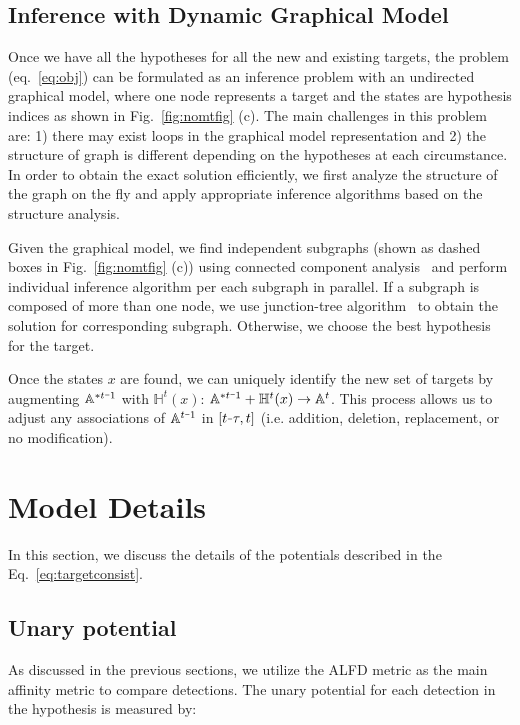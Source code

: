 \documentclass[10pt,twocolumn,letterpaper]{article}
\newcommand{\minus}{\scalebox{0.5}[1.0]{$-$}}
\begin{document}
\subsection{Inference with Dynamic Graphical Model}
\label{sec:selection}

Once we have all the hypotheses for all the new and existing targets, the problem (eq.~\ref{eq:obj}) can be formulated as an inference problem with an undirected graphical model, where one node represents a target and the states are hypothesis indices as shown in Fig.~\ref{fig:nomtfig} (c). The main challenges in this problem are: 1) there may exist loops in the graphical model representation and 2) the structure of graph is different depending on the hypotheses at each circumstance. In order to obtain the exact solution efficiently, we first analyze the structure of the graph on the fly and apply appropriate inference algorithms based on the structure analysis.

Given the graphical model, we find independent subgraphs (shown as dashed boxes in Fig.~\ref{fig:nomtfig} (c)) using connected component analysis~\cite{hopcroft1973algorithm} and perform individual inference algorithm per each subgraph in parallel. If a subgraph is composed of more than one node, we use junction-tree algorithm~\cite{koller2009probabilistic,LIBDAI} to obtain the solution for corresponding subgraph. Otherwise, we choose the best hypothesis for the target.

Once the states $x$ are found, we can uniquely identify the new set of targets by augmenting $\mathbb{A}^{* t \minus 1}$ with $\mathbb{H}^t(x)$:  $\mathbb{A}^{* t \minus 1} + \mathbb{H}^t(x) \rightarrow \mathbb{A}^t$. This process allows us to adjust any associations of $\mathbb{A}^{t \minus 1}$ in $[t\minus \tau, t]$ (i.e. addition, deletion, replacement, or no modification).

\section{Model Details}
\label{sec:details}
In this section, we discuss the details of the potentials described in the Eq.~\ref{eq:targetconsist}.

\subsection{Unary potential}
\label{sec:unary}

As discussed in the previous sections, we utilize the ALFD metric as the main affinity metric to compare detections. The unary potential for each detection in the hypothesis is measured by:
\end{document}
